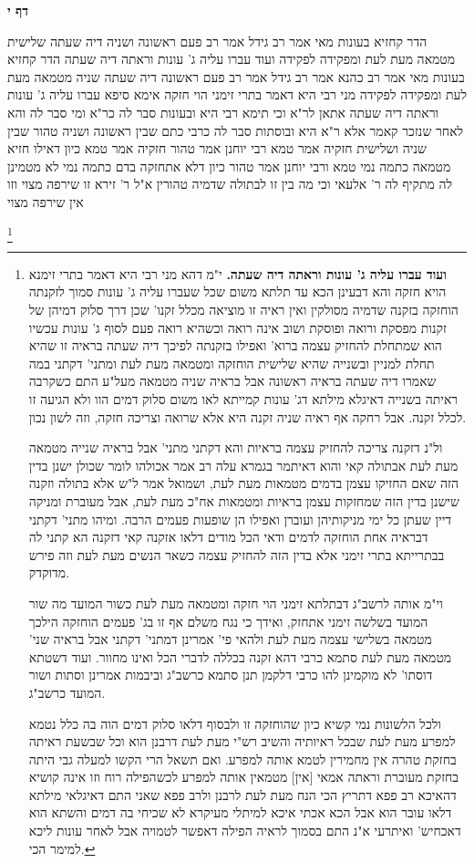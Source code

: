 \documentclass[12pt, openany]{book}
\newcommand{\sethebfont}{
\fontsize{10.5pt}{21.0pt} \selectfont
}
\newcommand{\twocol}[1]{
	{\sethebfont \begin{multicols}{2}
			#1
	\end{multicols}}	
}
\newcommand{\sectname}{}
\newcommand{\newsection}[1]{
	\addcontentsline{toc}{section}{#1}
	\renewcommand{\sectname}{#1}	
	\vspace{-\baselineskip}
	\begin{center}
		\textbf{%
\fontsize{16pt}{16pt}\selectfont
			#1}
	\end{center}
	\vspace{-\baselineskip}
	\nopagebreak
}
\newcommand{\footnotecomment}[1]{
	\renewcommand\thefootnote{}
	\footnote{#1}}
\newcommand{\commenta}[1]{\footnotecomment{#1}}
\begin{document}
\newsection{דף י}
\twocol{הדר קחזיא בעונות מאי אמר רב גידל אמר רב פעם ראשונה ושניה דיה שעתה שלישית מטמאה מעת לעת ומפקידה לפקידה 
ועוד עברו עליה ג' עונות וראתה דיה שעתה הדר קחזיא בעונות מאי 
אמר רב כהנא אמר רב גידל אמר רב פעם ראשונה דיה שעתה שניה מטמאה מעת לעת ומפקידה לפקידה 
מני רבי היא דאמר בתרי זימני הוי חזקה 
אימא סיפא עברו עליה ג' עונות וראתה דיה שעתה אתאן לר"א 
וכי תימא רבי היא ובעונות סבר לה כר"א ומי סבר לה והא לאחר שנזכר קאמר אלא ר"א היא ובוסתות סבר לה כרבי 
כתם שבין ראשונה ושניה טהור שבין שניה ושלישית חזקיה אמר טמא רבי יוחנן אמר טהור חזקיה אמר טמא כיון דאילו חזיא מטמאה כתמה נמי טמא ורבי יוחנן אמר טהור כיון דלא אתחזקה בדם כתמה נמי לא מטמינן לה
מתקיף לה ר' אלעאי וכי מה בין זו לבתולה שדמיה טהורין א"ל ר' זירא זו שירפה מצוי וזו אין שירפה מצוי 
\commenta{\textbf{ועוד עברו עליה ג' עונות וראתה דיה שעתה.} י"מ דהא מני רבי היא דאמר בתרי זימנא הויא חזקה והא דבעינן הכא עד תלתא משום שכל שעברו עליה ג' עונות סמוך לזקנתה הוחזקה בזקנה שדמיה מסולקין ואין ראיה זו מוציאה מכלל זקנו' שכן דרך סלוק דמיהן של זקנות מפסקת ורואה ופוסקת ושוב אינה רואה וכשהיא רואה פעם לסוף ג' עונות עכשיו הוא שמתחלת להחזיק עצמה ברוא' ואפילו בזקנתה לפיכך דיה שעתה בראיה זו שהיא תחלת למניין ובשנייה שהיא שלישית הוחזקה ומטמאה מעת לעת ומתני' דקתני במה שאמרו דיה שעתה בראיה ראשונה אבל בראיה שניה מטמאה מעל"ע התם כשקרבה ראיתה בשנייה דאיגלא מילתא דג' עונות קמייתא לאו משום סלוק דמים הוו ולא הגיעה זו לכלל זקנה. אבל רחקה אף ראיה שניה זקנה היא אלא שרואה וצריכה חזקה, וזה לשון נכון.\par ול"נ דזקנה צריכה להחזיק עצמה בראיות והא דקתני מתני' אבל בראיה שנייה מטמאה מעת לעת אבתולה קאי והוא דאיתמר בגמרא עלה רב אמר אכולהו לומר שכולן ישנן בדין הזה שאם החזיקו עצמן בדמים מטמאות מעת לעת, ושמואל אמר ל"ש אלא בתולה וזקנה שישנן בדין הזה שמחזקות עצמן בראיות ומטמאות אח"כ מעת לעת, אבל מעוברת ומניקה דיין שעתן כל ימי מניקותיהן ועוברן ואפילו הן שופעות פעמים הרבה. ומיהו מתני' דקתני דבראיה אחת הוחזקה לדמים ודאי הכל מודים דלאו אזקנה קאי דזקנה הא קתני לה בבתרייתא בתרי זימני אלא בדין הזה להחזיק עצמה כשאר הנשים מעת לעת וזה פירש מדוקדק.\par וי"מ אותה לרשב"ג דבתלתא זימני הוי חזקה ומטמאה מעת לעת כשור המועד מה שור המועד בשלשה זימני אתחזק, ואידך כי נגח משלם אף זו בג' פעמים הוחזקה הילכך מטמאה בשלישי עצמה מעת לעת ולהאי פי' אמרינן דמתני' דקתני אבל בראיה שני' מטמאה מעת לעת סתמא כרבי דהא זקנה בכללה לדברי הכל ואינו מחוור. ועוד דשטתא דוסתו' לא מוקמינן להו כרבי דלקמן תנן סתמא כרשב"ג וביבמות אמרינן וסתות ושור המועד כרשב"ג.\par ולכל הלשונות נמי קשיא כיון שהוחזקה זו ולבסוף דלאו סלוק דמים הוה בה כלל נטמא למפרע מעת לעת שבכל ראיותיה והשיב רש"י מעת לעת דרבנן הוא וכל שבשעת ראיתה בחזקת טהרה אין מחמירין לטמא אותה למפרע. ואם תשאל הרי הקשו למעלה גבי היתה בחזקת מעוברת וראתה אמאי [אין] מטמאין אותה למפרע לכשהפילה רוח וזו אינה קושיא דהאיכא רב פפא דתריץ הכי הנח מעת לעת לרבנן ולרב פפא שאני התם דאיגלאי מילתא דלאו עובר הוא אבל הכא אכתי איכא למיתלי מעיקרא לא שכיחי בה דמים והשתא הוא דאכחיש' ואיתרעי א"נ התם בסמוך לראיה הפילה דאפשר לטמויה אבל לאחר עונות ליכא למימר הכי. }
}
\end{document}
